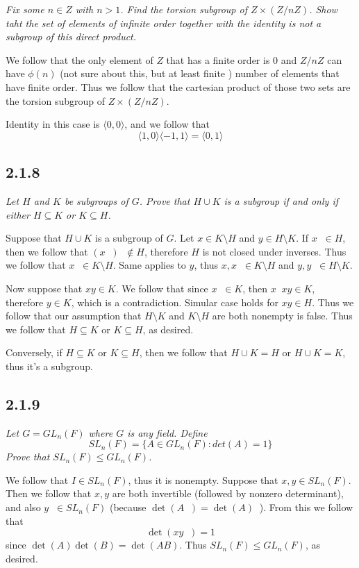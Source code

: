 \documentclass[11pt,oneside,titlepage]{book}
\DeclareMathOperator \inv {^{-1}}
\newcommand{\eangle}[1]{\langle #1 \rangle}
\begin{document}
\textit{Fix some $n \in Z$ with $n > 1$. Find the torsion subgroup of $Z \times (Z/nZ)$. Show
  taht the set of elements of infinite order together with the identity is not a subgroup
  of this direct product.}

We follow that the only element of $Z$ that has a finite order is $0$ and
$Z/nZ$ can have $\phi(n)$ (not sure about this, but at least finite ) number of elements
that have finite order. Thus we follow that the cartesian product of those two sets
are the torsion subgroup of $Z \times (Z/nZ)$.

Identity in this case is $\eangle{0, 0}$, and we follow that
$$\eangle{1, 0} \eangle{-1, 1} = \eangle{0, 1}$$

\subsection*{2.1.8}

\textit{Let $H$ and $K$ be subgroups of $G$. Prove that $H \cup K$ is a subgroup if and
  only if either $H \subseteq K$ or $K \subseteq H$.}

Suppose that $H \cup K$ is a subgroup of $G$. Let $x \in K \setminus H$ and
$y \in H \setminus K$. If $x \inv \in H$, then we follow that $(x\inv)\inv \notin H$, therefore
$H$ is not closed under inverses. Thus we follow that $x\inv \in K \setminus H$. Same
applies to $y$, thus $x, x\inv \in K \setminus H$ and $y, y\inv \in H \setminus K$.

Now suppose that $xy \in K$. We follow that since $x\inv \in K$, then $x\inv xy \in K$, therefore
$y \in K$, which is a contradiction. Simular case holds for $xy \in H$. Thus we follow that
our assumption that $H \setminus K$ and $K \setminus H$ are both nonempty is false. Thus we
follow that $H \subseteq K$ or $K \subseteq H$, as desired.

Conversely, if $H \subseteq K$ or $K \subseteq H$, then
we follow that $H \cup K = H$ or  $H \cup K = K$, thus it's a subgroup.

\subsection*{2.1.9}

\textit{Let $G = GL_n(F)$ where $G$ is any field. Define
  $$SL_n(F) = \{A \in GL_n(F): det(A) = 1\}$$
  Prove that $SL_n(F) \leq GL_n(F)$.}

We follow that $I \in SL_n(F)$, thus it is nonempty. Suppose that
$x, y \in SL_n(F)$. Then we follow that $x, y$ are both invertible (followed by
nonzero determinant), and also $y\inv \in SL_n(F)$ (because $\det(A\inv) = \det(A)\inv$).
From this we follow that
$$\det(x y \inv ) = 1$$
since $\det (A) \det (B) = \det(AB)$.
Thus $SL_n(F) \leq GL_n(F)$, as desired.
\end{document}
